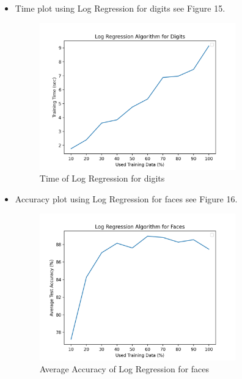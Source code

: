\documentclass{article}
\begin{document}
\begin{itemize}
    \item Time plot using Log Regression for digits see Figure 15.
    \begin{figure}
        \centering
        \includegraphics[width=0.8\textwidth]{logDiTime.png}
        \caption{Time of Log Regression for digits}
    \end{figure}
    
    \item Accuracy plot using Log Regression for faces see Figure 16.
    \begin{figure}
        \centering
        \includegraphics[width=0.8\textwidth]{logFa.png}
        \caption{Average Accuracy of Log Regression for faces}
    \end{figure}
    

\end{itemize}
\end{document}
